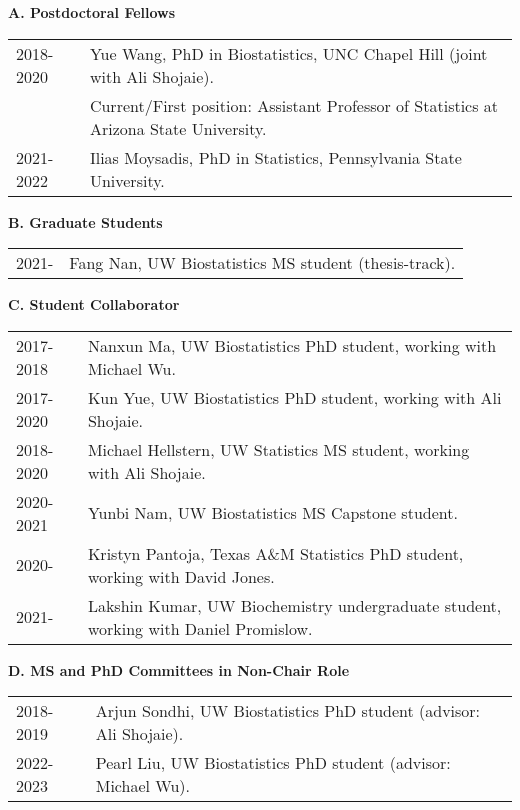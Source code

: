 \documentclass[10pt]{article}
\begin{document}
\textbf{A. Postdoctoral Fellows}
\begin{table}[H]
\hskip0.9cm\begin{tabular}{p{1.6cm}p{12cm}}
2018-2020 & Yue Wang, PhD in Biostatistics, UNC Chapel Hill (joint with Ali Shojaie).\\
& Current/First position: Assistant Professor of Statistics at Arizona State University.\\
2021-2022  & Ilias Moysadis, PhD in Statistics, Pennsylvania State University. 
\end{tabular}
\end{table}

\textbf{B. Graduate Students}

\begin{table}[H]
\hskip0.9cm\begin{tabular}{p{1.6cm}p{12cm}}
2021- & Fang Nan, UW Biostatistics MS student (thesis-track).
\end{tabular}
\end{table}

\textbf{C. Student Collaborator}
\begin{table}[H]
\hskip0.9cm\begin{tabular}{p{1.6cm}p{12cm}}
2017-2018 & Nanxun Ma, UW Biostatistics PhD student, working with Michael Wu.\\
2017-2020 & Kun Yue, UW Biostatistics PhD student, working with Ali Shojaie.\\
2018-2020 & Michael Hellstern, UW Statistics MS student, working with Ali Shojaie. \\
2020-2021 & Yunbi Nam, UW Biostatistics MS Capstone student. \\
2020- & Kristyn Pantoja, Texas A\&M Statistics PhD student, working with David Jones. \\
2021- & Lakshin Kumar, UW Biochemistry undergraduate student, working with Daniel Promislow.
\end{tabular}
\end{table}

\textbf{D. MS and PhD Committees in Non-Chair Role}
\begin{table}[H]
\hskip0.9cm\begin{tabular}{p{1.6cm}p{12cm}}
2018-2019 & Arjun Sondhi, UW Biostatistics PhD student (advisor: Ali Shojaie). \\
2022-2023 & Pearl Liu, UW Biostatistics PhD student (advisor: Michael Wu). 
\end{tabular}
\end{table}
\end{document}
